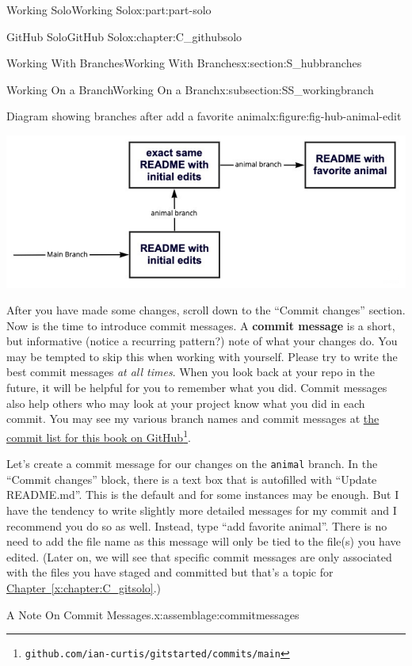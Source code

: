 \documentclass[oneside,10pt,]{book}
\newcommand{\xreffont}{\relax}
\newcommand{\mono}[1]{\texttt{#1}}
\newcommand{\terminology}[1]{\textbf{#1}}
\begin{document}
\begin{partptx}{Working Solo}{}{Working Solo}{}{}{x:part:part-solo}
\begin{chapterptx}{GitHub Solo}{}{GitHub Solo}{}{}{x:chapter:C_githubsolo}
\begin{sectionptx}{Working With Branches}{}{Working With Branches}{}{}{x:section:S_hubbranches}
\begin{subsectionptx}{Working On a Branch}{}{Working On a Branch}{}{}{x:subsection:SS_workingbranch}
\begin{figureptx}{Diagram showing branches after add a favorite animal}{x:figure:fig-hub-animal-edit}{}
\begin{image}{0}{1}{0}%
\includegraphics[width=\linewidth]{external/hub_animal_edit.pdf}
\end{image}%
\tcblower
\end{figureptx}%
 After you have made some changes, scroll down to the ``Commit changes'' section. Now is the time to introduce commit messages. A \terminology{commit message} is a short, but informative (notice a recurring pattern?) note of what your changes do. You may be tempted to skip this when working with yourself. Please try to write the best commit messages \emph{at all times}. When you look back at your repo in the future, it will be helpful for you to remember what you did. Commit messages also help others who may look at your project know what you did in each commit. You may see my various branch names and commit messages at \href{https://github.com/ian-curtis/gitstarted/commits/main}{the commit list for this book on GitHub}\footnote{\nolinkurl{github.com/ian-curtis/gitstarted/commits/main}\label{g:fn:idp616071688}}.%
\par
Let's create a commit message for our changes on the \mono{animal} branch. In the ``Commit changes'' block, there is a text box that is autofilled with ``Update README.md''. This is the default and for some instances may be enough. But I have the tendency to write slightly more detailed messages for my commit and I recommend you do so as well. Instead, type ``add favorite animal''. There is no need to add the file name as this message will only be tied to the file(s) you have edited. (Later on, we will see that specific commit messages are only associated with the files you have staged and committed but that's a topic for \hyperref[x:chapter:C_gitsolo]{Chapter~{\xreffont\ref{x:chapter:C_gitsolo}}}.)%
\begin{assemblage}{A Note On Commit Messages.}{x:assemblage:commitmessages}%

\end{assemblage}
\end{subsectionptx}
\end{sectionptx}
\end{chapterptx}
\end{partptx}
\end{document}
